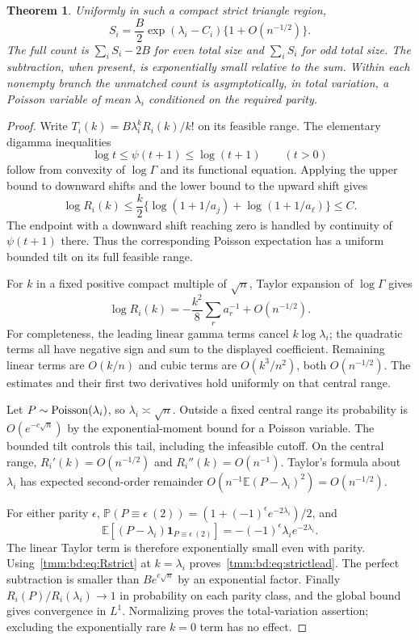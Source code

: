 \documentclass[11pt,letterpaper]{article}
\newtheorem{theorem}{Theorem}[section]
\theoremstyle{remark}\newtheorem{remark}[theorem]{Remark}
\newcommand{\E}{\mathbb E}\newcommand{\Pp}{\mathbb P}
\newcommand{\one}{\mathbf 1}\newcommand{\TV}{d_{\mathrm{TV}}}
\begin{document}
\begin{theorem}\label{tmm:bd:thm:strict}
Uniformly in such a compact strict triangle region,
\begin{equation}\label{tmm:bd:eq:strictlead}
 S_i=\frac B2\exp(\lambda_i-C_i)\{1+O(n^{-1/2})\}.
\end{equation}
The full count is $\sum_iS_i-2B$ for even total size and $\sum_iS_i$ for odd total size. The subtraction, when present, is exponentially small relative to the sum. Within each nonempty branch the unmatched count is asymptotically, in total variation, a Poisson variable of mean $\lambda_i$ conditioned on the required parity.
\end{theorem}
\begin{proof}
Write $T_i(k)=B\lambda_i^kR_i(k)/k!$ on its feasible range. The elementary digamma inequalities
\begin{equation}\label{tmm:bd:eq:digamma}
 \log t\le\psi(t+1)\le\log(t+1)\qquad(t>0)
\end{equation}
follow from convexity of $\log\Gamma$ and its functional equation. Applying the upper bound to downward shifts and the lower bound to the upward shift gives
\[
 \log R_i(k)\le\frac k2\{\log(1+1/a_j)+\log(1+1/a_\ell)\}\le C.
\]
The endpoint with a downward shift reaching zero is handled by continuity of $\psi(t+1)$ there. Thus the corresponding Poisson expectation has a uniform bounded tilt on its full feasible range.

For $k$ in a fixed positive compact multiple of $\sqrt n$, Taylor expansion of $\log\Gamma$ gives
\begin{equation}\label{tmm:bd:eq:Rstrict}
 \log R_i(k)=-\frac{k^2}{8}\sum_ra_r^{-1}+O(n^{-1/2}).
\end{equation}
For completeness, the leading linear gamma terms cancel $k\log\lambda_i$; the quadratic terms all have negative sign and sum to the displayed coefficient. Remaining linear terms are $O(k/n)$ and cubic terms are $O(k^3/n^2)$, both $O(n^{-1/2})$. The estimates and their first two derivatives hold uniformly on that central range.

Let $P\sim\operatorname{Poisson}(\lambda_i)$, so $\lambda_i\asymp\sqrt n$. Outside a fixed central range its probability is $O(e^{-c\sqrt n})$ by the exponential-moment bound for a Poisson variable. The bounded tilt controls this tail, including the infeasible cutoff. On the central range, $R_i'(k)=O(n^{-1/2})$ and $R_i''(k)=O(n^{-1})$. Taylor's formula about $\lambda_i$ has expected second-order remainder $O(n^{-1}\E(P-\lambda_i)^2)=O(n^{-1/2})$.

For either parity $\epsilon$, $\Pp(P\equiv\epsilon\ (2))=(1+(-1)^\epsilon e^{-2\lambda_i})/2$, and
\[
 \E[(P-\lambda_i)\one_{P\equiv\epsilon\ (2)}]
 =-(-1)^\epsilon\lambda_i e^{-2\lambda_i}.
\]
The linear Taylor term is therefore exponentially small even with parity. Using~\eqref{tmm:bd:eq:Rstrict} at $k=\lambda_i$ proves~\eqref{tmm:bd:eq:strictlead}. The perfect subtraction is smaller than $Be^{c\sqrt n}$ by an exponential factor. Finally $R_i(P)/R_i(\lambda_i)\to1$ in probability on each parity class, and the global bound gives convergence in $L^1$. Normalizing proves the total-variation assertion; excluding the exponentially rare $k=0$ term has no effect.
\end{proof}
\end{document}
